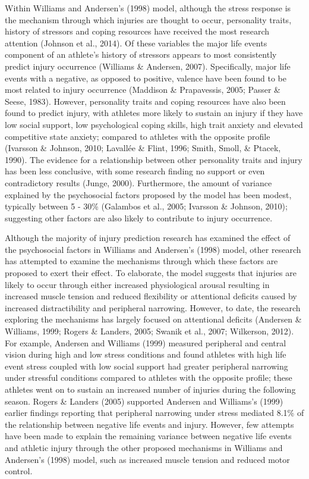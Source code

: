 \documentclass[
  english,
  man,floatsintext]{apa6}
\begin{document}
Within Williams and Andersen's (1998) model, although the stress response is the mechanism through which injuries are thought to occur, personality traits, history of stressors and coping resources have received the most research attention (Johnson et al., 2014).
Of these variables the major life events component of an athlete's history of stressors appears to most consistently predict injury occurrence (Williams \& Andersen, 2007).
Specifically, major life events with a negative, as opposed to positive, valence have been found to be most related to injury occurrence (Maddison \& Prapavessis, 2005; Passer \& Seese, 1983).
However, personality traits and coping resources have also been found to predict injury, with athletes more likely to sustain an injury if they have low social support, low psychological coping skills, high trait anxiety and elevated competitive state anxiety; compared to athletes with the opposite profile (Ivarsson \& Johnson, 2010; Lavallée \& Flint, 1996; Smith, Smoll, \& Ptacek, 1990).
The evidence for a relationship between other personality traits and injury has been less conclusive, with some research finding no support or even contradictory results (Junge, 2000).
Furthermore, the amount of variance explained by the psychosocial factors proposed by the model has been modest, typically between 5 - 30\% (Galambos et al., 2005; Ivarsson \& Johnson, 2010); suggesting other factors are also likely to contribute to injury occurrence.

Although the majority of injury prediction research has examined the effect of the psychosocial factors in Williams and Andersen's (1998) model, other research has attempted to examine the mechanisms through which these factors are proposed to exert their effect.
To elaborate, the model suggests that injuries are likely to occur through either increased physiological arousal resulting in increased muscle tension and reduced flexibility or attentional deficits caused by increased distractibility and peripheral narrowing. However, to date, the research exploring the mechanisms has largely focused on attentional deficits (Andersen \& Williams, 1999; Rogers \& Landers, 2005; Swanik et al., 2007; Wilkerson, 2012).
For example, Andersen and Williams (1999)
measured peripheral and central vision during high and low stress conditions and found athletes with high life event stress coupled with low social support had greater peripheral narrowing under stressful conditions compared to athletes with the opposite profile; these athletes went on to sustain an increased number of injuries during the following season.
Rogers \& Landers (2005) supported Andersen and Williams's (1999) earlier findings reporting that peripheral narrowing under stress mediated 8.1\% of the relationship between negative life events and injury.
However, few attempts have been made to explain the remaining variance between negative life events and athletic injury through the other proposed mechanisms in Williams and Andersen's (1998) model, such as increased muscle tension and reduced motor control.
\end{document}
